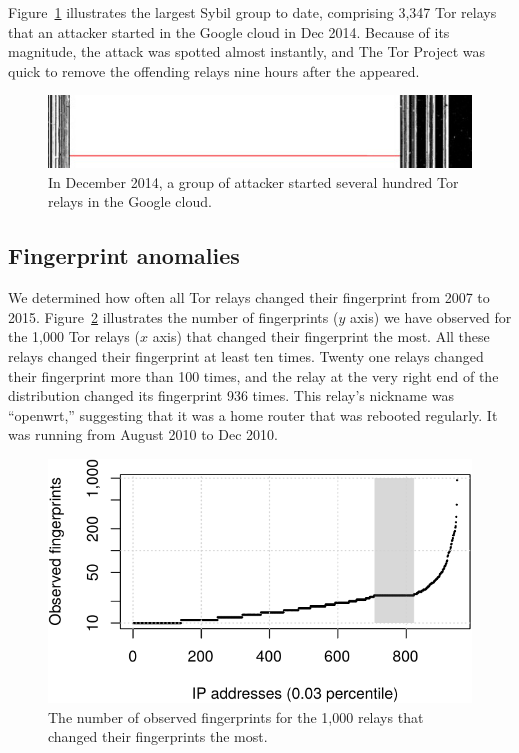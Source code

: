 Figure~\ref{fig:2014-12-lizard} illustrates the largest Sybil group to date,
comprising 3,347 Tor relays that an attacker started in the Google cloud in
Dec 2014.  Because of its magnitude, the attack was spotted almost
instantly, and The Tor Project was quick to remove the offending relays nine
hours after the appeared.

\begin{figure}[t]
	\centering
	\includegraphics[width=\linewidth]{diagrams/2014-12.jpg}
	\caption{In December 2014, a group of attacker started several hundred Tor
		relays in the Google cloud.}
	\label{fig:2014-12-lizard}
\end{figure}

\subsection{Fingerprint anomalies}
\label{sec:fingerprint-anomalies}
We determined how often all Tor relays changed their fingerprint from 2007 to
2015.  Figure~\ref{fig:fingerprints} illustrates the number of fingerprints ($y$
axis) we have observed for the 1,000 Tor relays ($x$ axis) that changed their
fingerprint the most.  All these relays changed their fingerprint at least ten
times.  Twenty one relays changed their fingerprint more than 100 times, and the
relay at the very right end of the distribution changed its fingerprint 936
times.  This relay's nickname was ``openwrt,'' suggesting that it was a home
router that was rebooted regularly.  It was running from August 2010 to Dec
2010.

\begin{figure}[t]
	\centering
	\includegraphics[width=0.8\linewidth]{diagrams/fingerprints.pdf}
	\caption{The number of observed fingerprints for the 1,000 relays that
	changed their fingerprints the most.}
	\label{fig:fingerprints}
\end{figure}

